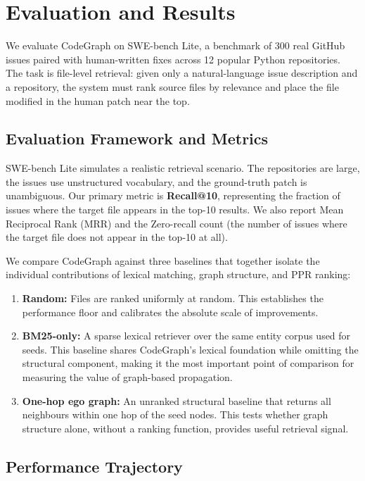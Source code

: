\section{Evaluation and Results}
\label{sec:evaluation}

We evaluate CodeGraph on SWE-bench Lite, a benchmark of 300 real GitHub issues paired with human-written fixes across 12 popular Python repositories. The task is file-level retrieval: given only a natural-language issue description and a repository, the system must rank source files by relevance and place the file modified in the human patch near the top.

\subsection{Evaluation Framework and Metrics}

SWE-bench Lite simulates a realistic retrieval scenario. The repositories are large, the issues use unstructured vocabulary, and the ground-truth patch is unambiguous. Our primary metric is \textbf{Recall@10}, representing the fraction of issues where the target file appears in the top-10 results. We also report Mean Reciprocal Rank (MRR) and the Zero-recall count (the number of issues where the target file does not appear in the top-10 at all). 

We compare CodeGraph against three baselines that together isolate the individual contributions of lexical matching, graph structure, and PPR ranking:
\begin{enumerate}
    \item \textbf{Random:} Files are ranked uniformly at random. This establishes the performance floor and calibrates the absolute scale of improvements.
    \item \textbf{BM25-only:} A sparse lexical retriever over the same entity corpus used for seeds. This baseline shares CodeGraph's lexical foundation while omitting the structural component, making it the most important point of comparison for measuring the value of graph-based propagation.
    \item \textbf{One-hop ego graph:} An unranked structural baseline that returns all neighbours within one hop of the seed nodes. This tests whether graph structure alone, without a ranking function, provides useful retrieval signal.
\end{enumerate}

\subsection{Performance Trajectory}

